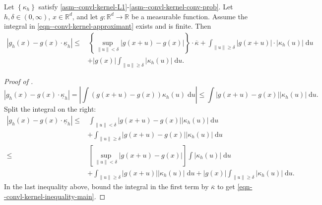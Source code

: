 \begin{theorem}
\label{thm--convl-kernel-point-error-bound}
Let \(\left\{ \kappa_{h} \right\}\) satisfy 
\ref{asm--convl-kernel-L1}-\ref{asm--convl-kernel-conv-prob}.
Let \(h, \delta \in (0, \infty)\), \(x \in \mathbb{R}^{d}\), and let
\(g : \mathbb{R}^{d} \to \mathbb{R}\) be a measurable function.
Assume the integral in \eqref{eqn--convl-kernel-approximant} exists and is
finite.
Then
\begin{equation}
  \begin{split}
    \left| g_{h} (x) - g (x) \cdot \underline{\kappa}_{h} \right| \leq
    & \, \left\{ \sup_{\|u\| < \delta} |g (x + u) - g (x)| \right\} \cdot
    \overline{\kappa} + \int_{\|u\| \geq \delta} |g (x + u)| \cdot \left|
    \kappa_{h} (u) \right| \; \mathrm{d} u \\
    & + |g (x)| \int_{\|u\| \geq \delta} \left| \kappa_{h} (u) \right| \;
    \mathrm{d} u.
  \end{split}
  \label{eqn--convl-kernel-inequality-main}
\end{equation}
\end{theorem}

\begin{proof}[Proof of ]
\begin{equation*}
  \left| g_{h} (x) - g (x) \cdot \underline{\kappa}_{h} \right| = \left| \int (g
  (x + u) - g (x)) \kappa_{h} (u) \; \mathrm{d} u \right| \leq \int |g (x + u) -
  g (x)| \left| \kappa_{h} (u) \right| \; \mathrm{d} u.
\end{equation*}
Split the integral on the right:
\begin{align*}
  \left| g_{h} (x) - g (x) \cdot \underline{\kappa}_{h} \right| \leq
  & \, \int_{\|u\| < \delta} |g (x + u) - g (x)| \left| \kappa_{h} (u) \right|
  \; \mathrm{d} u \\
  & + \int_{\|u\| \geq \delta} |g (x + u) - g (x)| \left| \kappa_{h} (u) \right|
  \; \mathrm{d} u \\
  \leq
  & \, \left[ \sup_{\|u\| < \delta} |g (x + u) - g (x)| \right] \int \left|
  \kappa_{h} (u) \right| \; \mathrm{d} u \\
  & + \int_{\|u\| \geq \delta} |g (x + u)| \left| \kappa_{h} (u) \right| \;
  \mathrm{d} u + |g (x)| \int_{\|u\| \geq \delta} \left| \kappa_{h} (u) \right|
  \; \mathrm{d} u.
\end{align*}
In the last inequality above, bound the integral in the first term by
\(\overline{\kappa}\) to get \eqref{eqn--convl-kernel-inequality-main}.
\end{proof}

